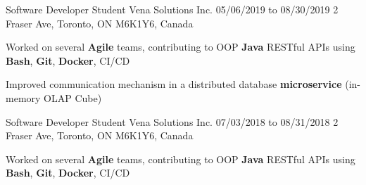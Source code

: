 \begin{cventries}
  \cventry
    {Software Developer Student} %
    {Vena Solutions Inc.} %
    {05/06/2019 to 08/30/2019} %
    {2 Fraser Ave, Toronto, ON M6K1Y6, Canada} %
    {
      \begin{cvitems} %
        \item{Worked on several \textbf{Agile} teams, contributing to OOP \textbf{Java} RESTful APIs using \textbf{Bash}, \textbf{Git}, \textbf{Docker}, CI/CD}
        \item{Improved communication mechanism in a distributed database \textbf{microservice} (in-memory OLAP Cube)}
%
      \end{cvitems}
    }
  \cventry
    {Software Developer Student} %
    {Vena Solutions Inc.} %
    {07/03/2018 to 08/31/2018} %
    {2 Fraser Ave, Toronto, ON M6K1Y6, Canada} %
    {
      \begin{cvitems} %
        \item{Worked on several \textbf{Agile} teams, contributing to OOP \textbf{Java} RESTful APIs using \textbf{Bash}, \textbf{Git}, \textbf{Docker}, CI/CD}

\end{cvitems}}
\end{cventries}
